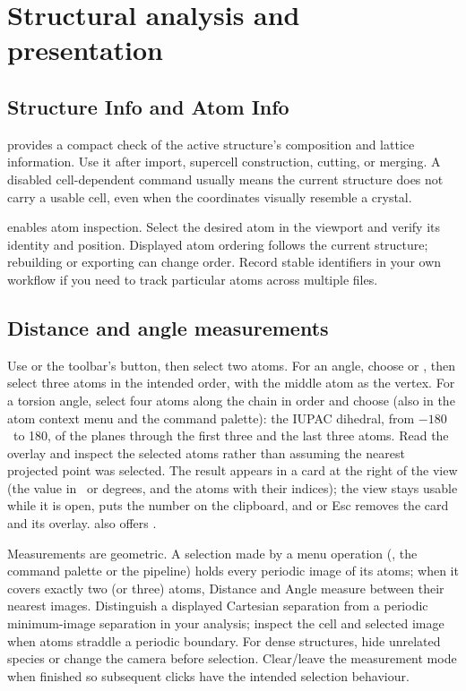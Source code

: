 \chapter{Structural analysis and presentation}\label{ch:analysis}
\section{Structure Info and Atom Info}
 provides a compact check of the active structure's composition and lattice information. Use it after import, supercell construction, cutting, or merging. A disabled cell-dependent command usually means the current structure does not carry a usable cell, even when the coordinates visually resemble a crystal.

 enables atom inspection. Select the desired atom in the viewport and verify its identity and position. Displayed atom ordering follows the current structure; rebuilding or exporting can change order. Record stable identifiers in your own workflow if you need to track particular atoms across multiple files.

\section{Distance and angle measurements}
Use  or the toolbar's  button, then select two atoms. For an angle, choose  or , then select three atoms in the intended order, with the middle atom as the vertex. For a torsion angle, select four atoms along the chain in order and choose  (also in the atom context menu and the command palette): the IUPAC dihedral, from $-180$\textdegree\ to 180\textdegree, of the planes through the first three and the last three atoms. Read the overlay and inspect the selected atoms rather than assuming the nearest projected point was selected. The result appears in a card at the right of the view (the value in \angstrom\ or degrees, and the atoms with their indices); the view stays usable while it is open,  puts the number on the clipboard, and  or Esc removes the card and its overlay.  also offers .

Measurements are geometric. A selection made by a menu operation (, the command palette or the pipeline) holds every periodic image of its atoms; when it covers exactly two (or three) atoms, Distance and Angle measure between their nearest images. Distinguish a displayed Cartesian separation from a periodic minimum-image separation in your analysis; inspect the cell and selected image when atoms straddle a periodic boundary. For dense structures, hide unrelated species or change the camera before selection. Clear/leave the measurement mode when finished so subsequent clicks have the intended selection behaviour.

